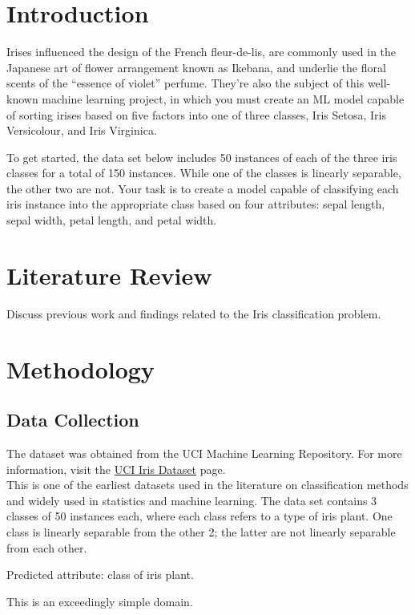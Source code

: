 \documentclass[a4paper]{article}
\begin{document}

\newpage
	\tableofcontents
\newpage

\section{Introduction}
Irises influenced the design of the French fleur-de-lis, are commonly used in the Japanese art of flower arrangement known as Ikebana, and underlie the floral scents of the “essence of violet” perfume. They’re also the subject of this well-known machine learning project, in which you must create an ML model capable of sorting irises based on five factors into one of three classes, Iris Setosa, Iris Versicolour, and Iris Virginica.

To get started, the data set below includes 50 instances of each of the three iris classes for a total of 150 instances. While one of the classes is linearly separable, the other two are not. Your task is to create a model capable of classifying each iris instance into the appropriate class based on four attributes: sepal length, sepal width, petal length, and petal width. 

\section{Literature Review}
Discuss previous work and findings related to the Iris classification problem.

\section{Methodology}
\subsection{Data Collection}
The dataset was obtained from the UCI Machine Learning Repository. For more information, visit the \href{https://archive.ics.uci.edu/ml/datasets/iris}{UCI Iris Dataset} page.\\
This is one of the earliest datasets used in the literature on classification methods and widely used in statistics and machine learning.  The data set contains 3 classes of 50 instances each, where each class refers to a type of iris plant.  One class is linearly separable from the other 2; the latter are not linearly separable from each other.

Predicted attribute: class of iris plant.

This is an exceedingly simple domain.
\end{document}
